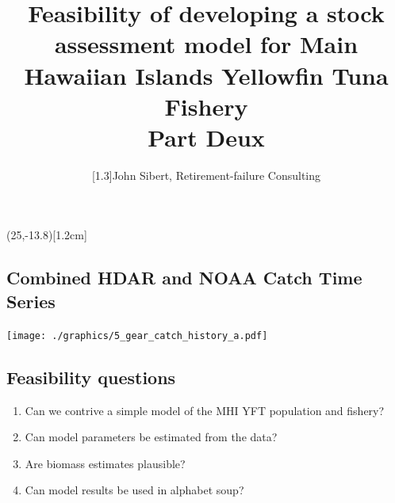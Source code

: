 \documentclass[letterpaper,KOMA,landscape,titlepage]{powersem}
\begin{document}
\pageTransitionReplace
\pagecounter[on]


\freelogo(25,-13.8)[1.2cm] %



\author{\scalebox{1}[1.3]{John Sibert, Retirement-failure Consulting}} 
\title{Feasibility of developing a stock assessment model for Main
Hawaiian Islands Yellowfin Tuna Fishery\\
\vspace{4ex}
Part Deux}


\address{\href{mailto:sibert@hawaii.edu}{sibert@hawaii.edu}}

\begin{slide}
\maketitle
\end{slide}
\centerslidesfalse

\begin{slide}\section{Combined HDAR and NOAA Catch Time Series}
\begin{center}
\texttt{[image: ./graphics/5\_gear\_catch\_history\_a.pdf]}\\
{\Large \bfseries \color{red}{No Recreational Data}\normalcolor}
\end{center}
\end{slide}

\begin{slide}\section{Feasibility questions}
\begin{enumerate}
\item Can we contrive a simple model of the MHI YFT population and
fishery?
\item Can model parameters be estimated from the data?
\item Are biomass estimates plausible?
\item Can model results be used in alphabet soup?
\end{enumerate}
\end{slide}
\end{document}
